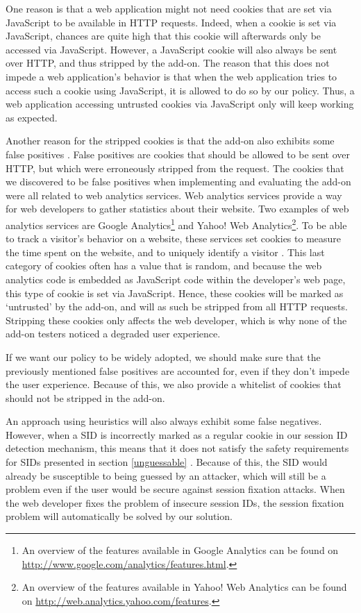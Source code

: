One reason is that a web application might not need cookies that are set via JavaScript to be available in HTTP requests. Indeed, when a cookie is set via JavaScript, chances are quite high that this cookie will afterwards only be accessed via JavaScript.  However, a JavaScript cookie will also always be sent over HTTP, and thus stripped by the add-on. The reason that this does not impede a web application's behavior is that when the web application tries to access such a cookie using JavaScript, it is allowed to do so by our policy. Thus, a web application accessing untrusted cookies via JavaScript only will keep working as expected.

Another reason for the stripped cookies is that the add-on also exhibits some false positives \cite{Bonne2011}. False positives are cookies that should be allowed to be sent over HTTP, but which were erroneously stripped from the request. The cookies that we discovered to be false positives when implementing and evaluating the add-on were all related to web analytics services. Web analytics services provide a way for web developers to gather statistics about their website. Two examples of web analytics services are Google Analytics\footnote{An overview of the features available in Google Analytics can be found on \url{http://www.google.com/analytics/features.html}.} and Yahoo! Web Analytics\footnote{An overview of the features available in Yahoo! Web Analytics can be found on \url{http://web.analytics.yahoo.com/features}.}. To be able to track a visitor's behavior on a website, these services set cookies to measure the time spent on the website, and to uniquely identify a visitor \cite{Tappenden2009,GoogleAnalytics}. This last category of cookies often has a value that is random, and because the web analytics code is embedded as JavaScript code within the developer's web page, this type of cookie is set via JavaScript. Hence, these cookies will be marked as `untrusted' by the add-on, and will as such be stripped from all HTTP requests. Stripping these cookies only affects the web developer, which is why none of the add-on testers noticed a degraded user experience.

If we want our policy to be widely adopted, we should make sure that the previously mentioned false positives are accounted for, even if they don't impede the user experience. Because of this, we also provide a whitelist of cookies that should not be stripped in the add-on.

An approach using heuristics will also always exhibit some false negatives. However, when a SID is incorrectly marked as a regular cookie in our session ID detection mechanism, this means that it does not satisfy the safety requirements for SIDs presented in section \ref{unguessable} \cite{Nikiforakis2010}. Because of this, the SID would already be susceptible to being guessed by an attacker, which will still be a problem even if the user would be secure against session fixation attacks. When the web developer fixes the problem of insecure session IDs, the session fixation problem will automatically be solved by our solution.

